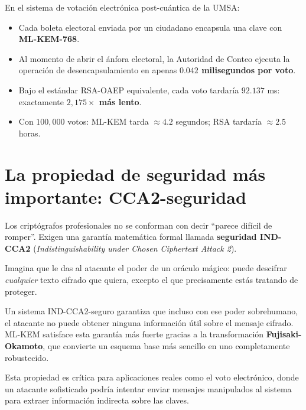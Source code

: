 \begin{ejemplonumerico}
En el sistema de votación electrónica post-cuántica de la UMSA:
\begin{itemize}
  \item Cada boleta electoral enviada por un ciudadano encapsula una clave con \textbf{ML-KEM-768}.
  \item Al momento de abrir el ánfora electoral, la Autoridad de Conteo ejecuta la operación de desencapsulamiento en apenas \textbf{$0.042$ milisegundos por voto}.
  \item Bajo el estándar RSA-OAEP equivalente, cada voto tardaría $92.137$ ms: exactamente \textbf{$2{,}175\times$ más lento}.
  \item Con $100{,}000$ votos: ML-KEM tarda $\approx 4.2$ segundos; RSA tardaría $\approx 2.5$ horas.
\end{itemize}
\end{ejemplonumerico}

\section{La propiedad de seguridad más importante: CCA2-seguridad}

Los criptógrafos profesionales no se conforman con decir ``parece difícil de romper''. Exigen una garantía matemática formal llamada \textbf{seguridad IND-CCA2} (\textit{Indistinguishability under Chosen Ciphertext Attack 2}).

\begin{intuicion}
Imagina que le das al atacante el poder de un oráculo mágico: puede descifrar \textit{cualquier} texto cifrado que quiera, excepto el que precisamente estás tratando de proteger.

Un sistema IND-CCA2-seguro garantiza que incluso con ese poder sobrehumano, el atacante no puede obtener ninguna información útil sobre el mensaje cifrado. ML-KEM satisface esta garantía más fuerte gracias a la transformación \textbf{Fujisaki-Okamoto}, que convierte un esquema base más sencillo en uno completamente robustecido.
\end{intuicion}

Esta propiedad es crítica para aplicaciones reales como el voto electrónico, donde un atacante sofisticado podría intentar enviar mensajes manipulados al sistema para extraer información indirecta sobre las claves.

